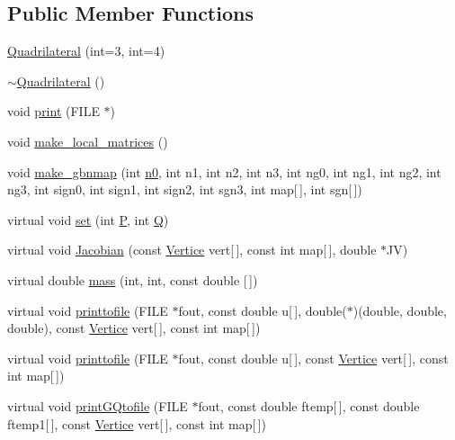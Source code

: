 \subsection*{Public Member Functions}
\begin{DoxyCompactItemize}
\item 
\hyperlink{classQuadrilateral_a5ddfd0486cac12fca281f7352059c99c}{Quadrilateral} (int=3, int=4)
\item 
\hyperlink{classQuadrilateral_ab7fc1753df6445a61dfc94790f9d0b5a}{$\sim$\+Quadrilateral} ()
\item 
void \hyperlink{classQuadrilateral_a6d1ef249f5359f422028e0635ccf1da7}{print} (F\+I\+LE $\ast$)
\item 
void \hyperlink{classQuadrilateral_a250590faeb6a0218430f02ee040a1818}{make\+\_\+local\+\_\+matrices} ()
\item 
void \hyperlink{classQuadrilateral_a5f3b8528600d00c640376f9170ca4b59}{make\+\_\+gbnmap} (int \hyperlink{DG__EI__Header_8h_a5f7b79d1f60dd1c85e99108c66052098}{n0}, int n1, int n2, int n3, int ng0, int ng1, int ng2, int ng3, int sign0, int sign1, int sign2, int sgn3, int map\mbox{[}$\,$\mbox{]}, int sgn\mbox{[}$\,$\mbox{]})
\item 
virtual void \hyperlink{classQuadrilateral_a369e691d1ae71d00f9474078d176f032}{set} (int \hyperlink{classStdel_a05cbb3f2a3fa0bc04a74e347dc6574cf}{P}, int \hyperlink{classStdel_a82074e598ad5af5ec45a3257a3c2b684}{Q})
\item 
virtual void \hyperlink{classQuadrilateral_af35d0775bd010cf4987925a035b1ec35}{Jacobian} (const \hyperlink{structVertice}{Vertice} vert\mbox{[}$\,$\mbox{]}, const int map\mbox{[}$\,$\mbox{]}, double $\ast$JV)
\item 
virtual double \hyperlink{classQuadrilateral_a63ff83a9100d597f694d76b3d5f147a5}{mass} (int, int, const double \mbox{[}$\,$\mbox{]})
\item 
virtual void \hyperlink{classQuadrilateral_af2a943c2b5b073fde641ce93b70f95b4}{printtofile} (F\+I\+LE $\ast$fout, const double u\mbox{[}$\,$\mbox{]}, double($\ast$)(double, double, double), const \hyperlink{structVertice}{Vertice} vert\mbox{[}$\,$\mbox{]}, const int map\mbox{[}$\,$\mbox{]})
\item 
virtual void \hyperlink{classQuadrilateral_a45573246616ded9a71b895de3969c20d}{printtofile} (F\+I\+LE $\ast$fout, const double u\mbox{[}$\,$\mbox{]}, const \hyperlink{structVertice}{Vertice} vert\mbox{[}$\,$\mbox{]}, const int map\mbox{[}$\,$\mbox{]})
\item 
virtual void \hyperlink{classQuadrilateral_a26cf4e787eb83848937831b5e388a05f}{print\+G\+Qtofile} (F\+I\+LE $\ast$fout, const double ftemp\mbox{[}$\,$\mbox{]}, const double ftemp1\mbox{[}$\,$\mbox{]}, const \hyperlink{structVertice}{Vertice} vert\mbox{[}$\,$\mbox{]}, const int map\mbox{[}$\,$\mbox{]})

\end{DoxyCompactItemize}
